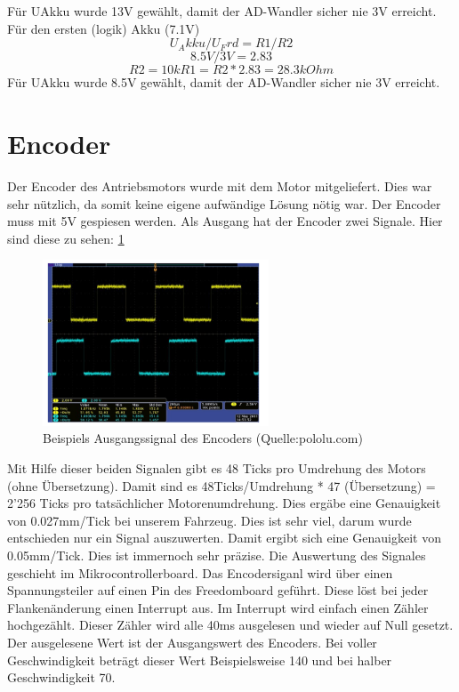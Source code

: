 \documentclass[a4paper, 10pt, fleqn]{article}
\begin{document}
Für UAkku wurde 13V gewählt, damit der AD-Wandler sicher nie 3V erreicht.\\
Für den ersten (logik) Akku (7.1V)
\[	U_Akku/U_Frd=R1/R2\]
\[	8.5V/3V=2.83\]
\[	R2=10k R1=R2*2.83=28.3kOhm\]
Für UAkku wurde 8.5V gewählt, damit der AD-Wandler sicher nie 3V erreicht.\\

\section{Encoder}
Der Encoder des Antriebsmotors wurde mit dem Motor mitgeliefert. Dies war sehr nützlich, da somit keine eigene aufwändige Lösung nötig war. Der Encoder muss mit 5V gespiesen werden. Als Ausgang hat der Encoder zwei Signale. Hier sind diese zu sehen:
\ref{fig:encoder_out}
\begin{figure}[H]%
\centering
\includegraphics[width=0.6\textwidth]{Images/Encoder_Out.PNG}
\caption{Beispiels Ausgangssignal des Encoders (Quelle:pololu.com)}
\label{fig:encoder_out}
\end{figure}
Mit Hilfe dieser beiden Signalen gibt es 48 Ticks pro Umdrehung des Motors (ohne Übersetzung). Damit sind es 48Ticks/Umdrehung * 47 (Übersetzung) = 2'256 Ticks pro tatsächlicher Motorenumdrehung. Dies ergäbe eine Genauigkeit von 0.027mm/Tick bei unserem Fahrzeug. Dies ist sehr viel, darum wurde entschieden nur ein Signal auszuwerten. Damit ergibt sich eine Genauigkeit von 0.05mm/Tick. Dies ist immernoch sehr präzise.
Die Auswertung des Signales geschieht im Mikrocontrollerboard. Das Encodersiganl wird über einen Spannungsteiler auf einen Pin des Freedomboard geführt. Diese löst bei jeder Flankenänderung einen Interrupt aus. Im Interrupt wird einfach einen Zähler hochgezählt. Dieser Zähler wird alle 40ms ausgelesen und wieder auf Null gesetzt. Der ausgelesene Wert ist der Ausgangswert des Encoders. Bei voller Geschwindigkeit beträgt dieser Wert Beispielsweise 140 und bei halber Geschwindigkeit 70.
 
\end{document}
